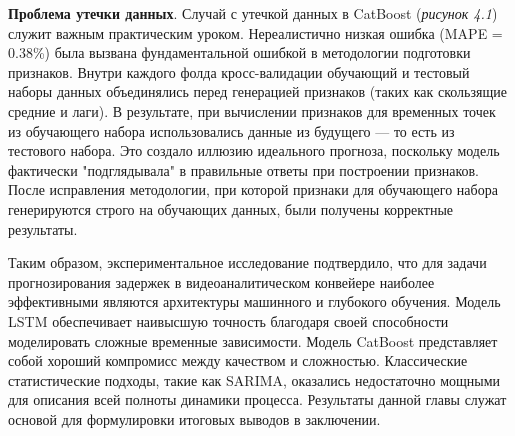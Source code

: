 \hspace*{1.25cm} \textbf{Проблема утечки данных}. Случай с утечкой данных в CatBoost (\textit{рисунок 4.1}) служит важным практическим уроком. Нереалистично низкая ошибка (MAPE = 0.38\%) была вызвана фундаментальной ошибкой в методологии подготовки признаков. Внутри каждого фолда кросс-валидации обучающий и тестовый наборы данных объединялись перед генерацией признаков (таких как скользящие средние и лаги). В результате, при вычислении признаков для временных точек из обучающего набора использовались данные из будущего — то есть из тестового набора. Это создало иллюзию идеального прогноза, поскольку модель фактически "подглядывала" в правильные ответы при построении признаков. После исправления методологии, при которой признаки для обучающего набора генерируются строго на обучающих данных, были получены корректные результаты.


\hspace*{1.25cm}Таким образом, экспериментальное исследование подтвердило, что для задачи прогнозирования задержек в видеоаналитическом конвейере наиболее эффективными являются архитектуры машинного и глубокого обучения. Модель LSTM обеспечивает наивысшую точность благодаря своей способности моделировать сложные временные зависимости. Модель CatBoost представляет собой хороший компромисс между качеством и сложностью. Классические статистические подходы, такие как SARIMA, оказались недостаточно мощными для описания всей полноты динамики процесса. Результаты данной главы служат основой для формулировки итоговых выводов в заключении.
